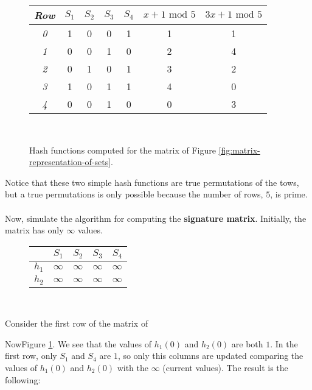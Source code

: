 \begin{figure}[H]
\centering
\begin{tabular}{|c|c|c|c|c||c|c|}
  \hline
  \textit{Row} & $S_1$ & $S_2$ & $S_3$ & $S_4$ & $x + 1 \text{ mod } 5$ & $3x + 1 \text{ mod } 5$\\
  \hline
  \textit{0} & 1 & 0 & 0 & 1 & 1 & 1 \\
  \textit{1} & 0 & 0 & 1 & 0 & 2 & 4 \\
  \textit{2} & 0 & 1 & 0 & 1 & 3 & 2 \\
  \textit{3} & 1 & 0 & 1 & 1 & 4 & 0 \\
  \textit{4} & 0 & 0 & 1 & 0 & 0 & 3 \\
  \hline
\end{tabular}
\captionsetup{justification=centering}\\
\caption{Hash functions computed for the matrix of Figure \ref{fig:matrix-representation-of-sets}.}
\label{fig:matrix-hash-functions}
\end{figure}

Notice that these two simple hash functions are true permutations of the tows, but a true permutations is only possible because the number of rows, $5$, is prime.
\\
\\
Now, simulate the algorithm for computing the \textbf{signature matrix}. Initially, the matrix has only $\infty$ values. 

\begin{figure}[H]
\centering
\begin{tabular}{|c||c|c|c|c|}
  \hline
   & $S_1$ & $S_2$ & $S_3$ & $S_4$\\
  \hline
  $h_1$ & $\infty$ & $\infty$ & $\infty$ & $\infty$ \\ 
  $h_2$ & $\infty$ & $\infty$ & $\infty$ & $\infty$ \\
  \hline
\end{tabular}
\captionsetup{justification=centering}\\
\label{fig:sig-matrix-0}
\end{figure}

Consider the first row of the matrix of 

NowFigure \ref{fig:matrix-hash-functions}. We see that the values of $h_1(0)$ and $h_2(0)$ are both $1$. In the first row, only $S_1$ and $S_4$ are $1$, so only this columns are updated comparing the values of $h_1(0)$ and $h_2(0)$ with the $\infty$ (current values). The result is the following: 


